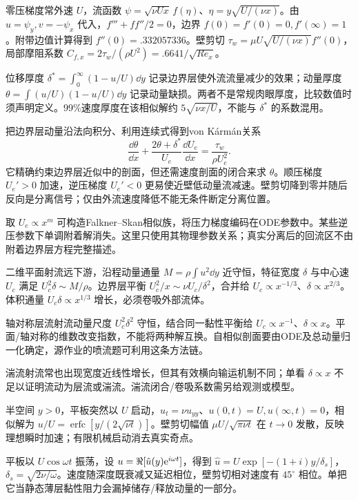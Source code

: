 零压梯度常外速 $U$，流函数 $\psi=\sqrt{\nu Ux}\,f(\eta)$、$\eta=y\sqrt{U/(\nu x)}$。由 $u=\psi_y,v=-\psi_x$ 代入，$f'''+ff''/2=0$，边界 $f(0)=f'(0)=0,f'(\infty)=1$。附带边值计算得到 $f''(0)=.332057336$。壁剪切 $\tau_w=\mu U\sqrt{U/(\nu x)}f''(0)$，局部摩阻系数 $C_{f,x}=2\tau_w/(\rho U^2)=.6641/\sqrt{Re_x}$。

位移厚度 $\delta^*=\int_0^\infty(1-u/U)\dd y$ 记录边界层使外流流量减少的效果；动量厚度 $\theta=\int(u/U)(1-u/U)\dd y$ 记录动量缺损。两者不是常规肉眼厚度，比较数值时须声明定义。99\%速度厚度在该相似解约 $5\sqrt{\nu x/U}$，不能与 $\delta^*$ 的系数混用。

把边界层动量沿法向积分、利用连续式得到von K\'arm\'an关系
\[
\frac{\dd\theta}{\dd x}+\frac{2\theta+\delta^*}{U_e}\frac{\dd U_e}{\dd x}
=\frac{\tau_w}{\rho U_e^2}.
\]
它精确约束边界层近似中的剖面，但还需速度剖面的闭合来求 $\theta$。顺压梯度 $U_e'>0$ 加速，逆压梯度 $U_e'<0$ 更易使近壁低动量流减速。壁剪切降到零并随后反向是分离信号；仅由外流速度降低不能无条件断定分离位置。

取 $U_e\propto x^m$ 可构造Falkner--Skan相似族，将压力梯度编码在ODE参数中。某些逆压参数下单调附着解消失。这里只使用其物理参数关系；真实分离后的回流区不由附着边界层方程完整描述。

二维平面射流远下游，沿程动量通量 $M=\rho\int u^2\dd y$ 近守恒，特征宽度 $\delta$ 与中心速 $U_c$ 满足 $U_c^2\delta\sim M/\rho$。边界层平衡 $U_c^2/x\sim\nu U_c/\delta^2$，合并给 $U_c\propto x^{-1/3}$、$\delta\propto x^{2/3}$。体积通量 $U_c\delta\propto x^{1/3}$ 增长，必须卷吸外部流体。

轴对称层流射流动量尺度 $U_c^2\delta^2$ 守恒，结合同一黏性平衡给 $U_c\propto x^{-1}$、$\delta\propto x$。平面/轴对称的维数改变指数，不能将两种解互换。自相似剖面要由ODE及总动量归一化确定，源作业的喷流题可利用这条方法链。

湍流射流常也出现宽度近线性增长，但其有效横向输运机制不同；单看 $\delta\propto x$ 不足以证明流动为层流或湍流。湍流闭合/卷吸系数需另给观测或模型。

半空间 $y>0$，平板突然以 $U$ 启动，$u_t=\nu u_{yy}$、$u(0,t)=U,u(\infty,t)=0$，相似解为 $u/U=\operatorname{erfc}[y/(2\sqrt{\nu t})]$。壁剪切幅值 $\mu U/\sqrt{\pi\nu t}$ 在 $t\to0$ 发散，反映理想瞬时加速；有限机械启动消去真实奇点。

平板以 $U\cos\omega t$ 振荡，设 $u=\Re[\hat u(y)\mathrm e^{i\omega t}]$，得到 $\hat u=U\exp[-(1+i)y/\delta_s]$，$\delta_s=\sqrt{2\nu/\omega}$。速度随深度既衰减又延迟相位，壁剪切相对速度有 $45^\circ$ 相位。单把它当静态薄层黏性阻力会漏掉储存/释放动量的一部分。

